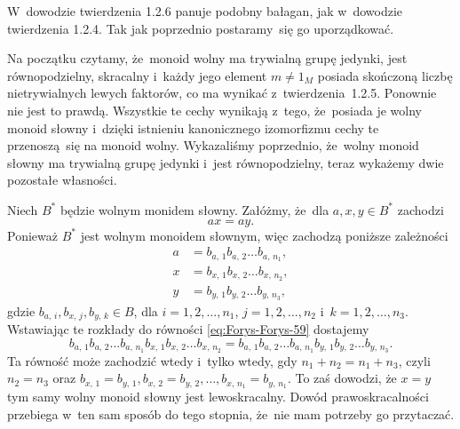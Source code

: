 \documentclass[a4paper,11pt]{article}
\begin{document}
\vspace{\spaceFour}





 W~dowodzie twierdzenia 1.2.6 panuje podobny bałagan,
jak w~dowodzie twierdzenia 1.2.4. Tak jak poprzednio postaramy~się go
uporządkować.

Na początku czytamy, że~monoid wolny ma trywialną grupę jedynki, jest
równopodzielny, skracalny i~każdy jego element $m \neq 1_{ M }$
posiada skończoną liczbę nietrywialnych lewych faktorów, co ma wynikać
z~twierdzenia~1.2.5. Ponownie nie jest to prawdą. Wszystkie te cechy
wynikają z~tego, że~posiada je wolny monoid słowny i~dzięki istnieniu
kanonicznego izomorfizmu cechy te przenoszą~się na monoid wolny.
Wykazaliśmy poprzednio, że~wolny monoid słowny ma trywialną grupę
jedynki i~jest równopodzielny, teraz wykażemy dwie pozostałe
własności.

Niech $B^{ * }$ będzie wolnym monidem słowny. Załóżmy, że~dla
$a, x, y \in B^{ * }$ zachodzi
\begin{equation}
  \label{eq:Forys-Forys-59}
  a x = a y.
\end{equation}
Ponieważ $B^{ * }$ jest wolnym monoidem słownym, więc zachodzą
poniższe zależności
\begin{subequations}
  \begin{align}
    \label{eq:Forys-Forys-60-A}
    a &= b_{ a,\, 1 } b_{ a,\, 2 } \ldots b_{ a,\, n_{ 1 } }, \\
    \label{eq:Forys-Forys-60-B}
    x &= b_{ x,\, 1 } b_{ x,\, 2 } \ldots b_{ x,\, n_{ 2 } }, \\
    \label{eq:Forys-Forys-60-C}
    y &= b_{ y,\, 1 } b_{ y,\, 2 } \ldots b_{ y,\, n_{ 3 } },
  \end{align}
\end{subequations}
gdzie $b_{ a,\, i }, b_{ x,\, j }, b_{ y,\, k } \in B$, dla
$i = 1, 2, \ldots, n_{ 1 }$, $j = 1, 2, \ldots, n_{ 2 }$
i~$k = 1, 2, \ldots, n_{ 3 }$. Wstawiając te rozkłady do równości
\eqref{eq:Forys-Forys-59} dostajemy
\begin{equation}
  \label{eq:Forys-Forys-61}
  b_{ a,\, 1 } b_{ a,\, 2 } \ldots b_{ a,\, n_{ 1 } } b_{ x,\, 1 }
  b_{ x,\, 2 } \ldots b_{ x,\, n_{ 2 } }
  =
  b_{ a,\, 1 } b_{ a,\, 2 } \ldots b_{ a,\, n_{ 1 } } b_{ y,\, 1 }
  b_{ y,\, 2 } \ldots b_{ y,\, n_{ 3 } }.
\end{equation}
Ta równość może zachodzić wtedy i~tylko wtedy, gdy
$n_{ 1 } + n_{ 2 } = n_{ 1 } + n_{ 3 }$, czyli $n_{ 2 } = n_{ 3 }$
oraz
$b_{ x,\, 1 } = b_{ y,\, 1 }, b_{ x,\, 2 } = b_{ y,\, 2 }, \ldots, b_{ x,\,
  n_{ 1 } } = b_{ y,\, n_{ 1 } }$. To zaś dowodzi, że $x = y$ tym samy
wolny monoid słowny jest lewoskracalny. Dowód prawoskracalności
przebiega w~ten sam sposób do tego stopnia, że~nie mam potrzeby go
przytaczać.
\end{document}
